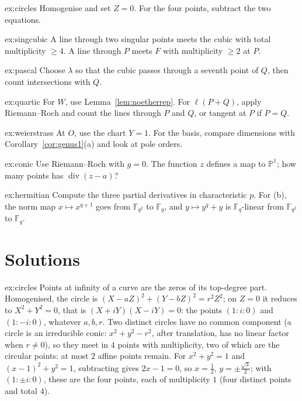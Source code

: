 \begin{hint}{ex:circles}
Homogenise and set $Z=0$. For the four points, subtract the two equations.
\end{hint}
\begin{hint}{ex:singcubic}
A line through two singular points meets the cubic with total multiplicity $\ge4$. A line through $P$ meets $F$ with multiplicity $\ge2$ at $P$.
\end{hint}
\begin{hint}{ex:pascal}
Choose $\lambda$ so that the cubic passes through a seventh point of $Q$, then count intersections with $Q$.
\end{hint}
\begin{hint}{ex:quartic}
For $W$, use Lemma~\ref{lem:noetherrep}. For $\ell(P+Q)$, apply Riemann--Roch and count the lines through $P$ and $Q$, or tangent at $P$ if $P=Q$.
\end{hint}
\begin{hint}{ex:weierstrass}
At $O$, use the chart $Y=1$. For the basis, compare dimensions with Corollary~\ref{cor:genus1}(a) and look at pole orders.
\end{hint}
\begin{hint}{ex:conic}
Use Riemann--Roch with $g=0$. The function $z$ defines a map to $\mathbb P^1$; how many points has $\operatorname{div}(z-a)$?
\end{hint}
\begin{hint}{ex:hermitian}
Compute the three partial derivatives in characteristic $p$. For (b), the norm map $x\mapsto x^{q+1}$ goes from $\mathbb F_{q^2}$ to $\mathbb F_q$, and $y\mapsto
y^q+y$ is $\mathbb F_q$-linear from $\mathbb F_{q^2}$ to $\mathbb F_q$.
\end{hint}

\section{Solutions}

\begin{solution}{ex:circles}
\idea Points at infinity of a curve are the zeros of its top-degree part.
\writeup Homogenised, the circle is $(X-aZ)^2+(Y-bZ)^2=r^2Z^2$; on $Z=0$ it reduces to $X^2+Y^2=0$, that is $(X+iY)(X-iY)=0$: the points $(1:i:0)$ and
$(1:-i:0)$, whatever $a,b,r$. Two distinct circles have no common component (a circle is an irreducible conic: $x^2+y^2-r^2$, after translation, has no
linear factor when $r\ne0$), so they meet in $4$ points with multiplicity, two of which are the circular points: at most $2$ affine points remain. For
$x^2+y^2=1$ and $(x-1)^2+y^2=1$, subtracting gives $2x-1=0$, so $x=\frac12$, $y=\pm\frac{\sqrt3}2$; with $(1:\pm i:0)$, these are the four points, each of
multiplicity $1$ (four distinct points and total $4$).
\end{solution}

